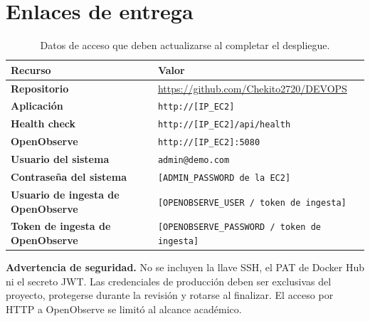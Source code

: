 \documentclass[12pt,a4paper]{article}
\makeatletter
\newcommand{\repoURL}{https://github.com/Chekito2720/DEVOPS}
\newcommand{\ecURL}{http://[IP\_EC2]}
\newcommand{\healthURL}{http://[IP\_EC2]/api/health}
\newcommand{\observeURL}{http://[IP\_EC2]:5080}
\newcommand{\adminCredential}{admin@demo.com}
\newcommand{\adminPassword}{[ADMIN\_PASSWORD de la EC2]}
\newcommand{\observeCredential}{[OPENOBSERVE\_USER / token de ingesta]}
\newcommand{\observePassword}{[OPENOBSERVE\_PASSWORD / token de ingesta]}
\makeatother
\begin{document}
\section{Enlaces de entrega}

\begin{table}[H]
  \centering
  \caption{Datos de acceso que deben actualizarse al completar el despliegue.}
  \begin{tabularx}{\textwidth}{>{\bfseries}p{4.2cm} X}
    \toprule
    Recurso & Valor \\
    \midrule
    Repositorio & \url{\repoURL} \\
    Aplicación & \texttt{\ecURL} \\
    Health check & \texttt{\healthURL} \\
    OpenObserve & \texttt{\observeURL} \\
    Usuario del sistema & \texttt{\adminCredential} \\
    Contraseña del sistema & \texttt{\adminPassword} \\
    Usuario de ingesta de OpenObserve & \texttt{\observeCredential} \\
    Token de ingesta de OpenObserve & \texttt{\observePassword} \\
    \bottomrule
  \end{tabularx}
\end{table}

\noindent\textbf{Advertencia de seguridad.} No se incluyen la llave SSH, el PAT de Docker Hub ni el secreto JWT. Las credenciales de producción deben ser exclusivas del proyecto, protegerse durante la revisión y rotarse al finalizar. El acceso por HTTP a OpenObserve se limitó al alcance académico.

\end{document}
